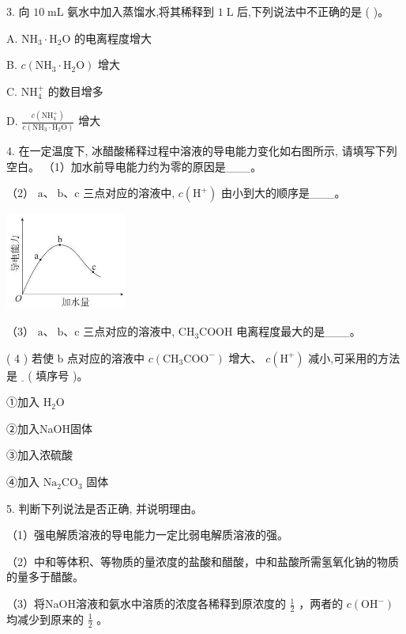 \documentclass[10pt]{article}
\begin{document}
3. 向 \({10}\mathrm{\;{mL}}\) 氨水中加入蒸馏水,将其稀释到 \(1\mathrm{\;L}\) 后,下列说法中不正确的是 ( )。

A. \({\mathrm{{NH}}}_{3} \cdot {\mathrm{H}}_{2}\mathrm{O}\) 的电离程度增大

B. \(c\left( {{\mathrm{{NH}}}_{3} \cdot {\mathrm{H}}_{2}\mathrm{O}}\right)\) 增大

C. \({\mathrm{{NH}}}_{4}^{ + }\) 的数目增多

D. \(\frac{c\left( {\mathrm{{NH}}}_{4}^{ + }\right) }{c\left( {{\mathrm{{NH}}}_{3} \cdot {\mathrm{H}}_{2}\mathrm{O}}\right) }\) 增大

4. 在一定温度下, 冰醋酸稀释过程中溶液的导电能力变化如右图所示, 请填写下列空白。 （1）加水前导电能力约为零的原因是\_\_\_。

（2） \(\mathrm{a}\text{、}\mathrm{\;b}\text{、}\mathrm{c}\) 三点对应的溶液中, \(c\left( {\mathrm{H}}^{ + }\right)\) 由小到大的顺序是\_\_\_。

\begin{center}
\includegraphics[max width=0.3\textwidth]{images/0190da9d-8bfd-732f-bc2c-0b21d0f13b91_67_985231.jpg}
\end{center}

（3） \(\mathrm{a}\text{、}\mathrm{\;b}\text{、}\mathrm{c}\) 三点对应的溶液中, \({\mathrm{{CH}}}_{3}\mathrm{{COOH}}\) 电离程度最大的是\_\_\_。

( 4 ) 若使 \(\mathrm{b}\) 点对应的溶液中 \(c\left( {{\mathrm{{CH}}}_{3}{\mathrm{{COO}}}^{ - }}\right)\) 增大、 \(c\left( {\mathrm{H}}^{ + }\right)\) 减小,可采用的方法是 \(\underline{\;}\) ( 填序号 )。

①加入 \({\mathrm{H}}_{2}\mathrm{O}\)

②加入NaOH固体

③加入浓硫酸

④加入 \({\mathrm{{Na}}}_{2}{\mathrm{{CO}}}_{3}\) 固体

5. 判断下列说法是否正确, 并说明理由。

（1）强电解质溶液的导电能力一定比弱电解质溶液的强。

（2）中和等体积、等物质的量浓度的盐酸和醋酸，中和盐酸所需氢氧化钠的物质的量多于醋酸。

（3）将NaOH溶液和氨水中溶质的浓度各稀释到原浓度的 \(\frac{1}{2}\) ，两者的 \(c\left( {\mathrm{{OH}}}^{ - }\right)\) 均减少到原来的 \(\frac{1}{2}\) 。
\end{document}
